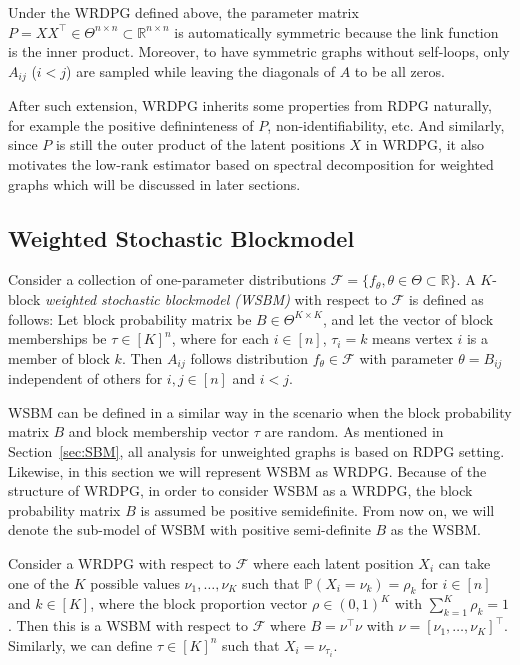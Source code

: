 Under the WRDPG defined above, the parameter matrix $P = X X^{\top} \in \Theta^{n \times n} \subset \mathbb{R}^{n \times n}$ is automatically symmetric because the link function is the inner product. Moreover, to have symmetric graphs without self-loops, only $A_{ij}$ ($i < j$) are sampled while leaving the diagonals of $A$ to be all zeros.

After such extension, WRDPG inherits some properties from RDPG naturally, for example the positive defininteness of $P$, non-identifiability, etc. And similarly, since $P$ is still the outer product of the latent positions $X$ in WRDPG, it also motivates the low-rank estimator based on spectral decomposition for weighted graphs which will be discussed in later sections.




\subsection{Weighted Stochastic Blockmodel}
\label{sec:WSBM}

\begin{definition} 
\label{def:SBM}
Consider a collection of one-parameter distributions $\mathcal{F} = \{ f_{\theta}, \theta \in \Theta \subset \mathbb{R} \}$. A $K$-block {\em{weighted stochastic blockmodel (WSBM)}} with respect to $\mathcal{F}$ is defined as follows: Let block probability matrix be $B \in \Theta^{K \times K}$, and let the vector of block memberships be $\tau \in [K]^n$, where for each $i \in [n]$, $\tau_i = k$ means vertex $i$ is a member of block $k$. Then $A_{ij}$ follows distribution $f_{\theta} \in \mathcal{F}$ with parameter $\theta = B_{ij}$ independent of others for $i, j \in [n]$ and $i < j$.
\end{definition}

WSBM can be defined in a similar way in the scenario when the block probability matrix $B$ and block membership vector $\tau$ are random. As mentioned in Section~\ref{sec:SBM}, all analysis for unweighted graphs is based on RDPG setting. Likewise, in this section we will represent WSBM as WRDPG. Because of the structure of WRDPG, in order to consider WSBM as a WRDPG, the block probability matrix $B$ is assumed be positive semidefinite. From now on, we will denote the sub-model of WSBM with positive semi-definite $B$ as the WSBM.

\begin{definition} 
\label{def:SBM_RDPG}
Consider a WRDPG with respect to $\mathcal{F}$ where each latent position $X_i$ can take one of the $K$ possible values $\nu_1, \dots, \nu_K$ such that $\mathbb{P}(X_i = \nu_k) = \rho_k$ for $i \in [n]$ and $k \in [K]$, where the block proportion vector $\rho \in (0,1)^K$ with $\sum_{k=1}^K \rho_k = 1$. Then this is a WSBM with respect to $\mathcal{F}$ where $B = \nu^{\top} \nu$ with $\nu = [\nu_1, \dots, \nu_K]^{\top}$. Similarly, we can define $\tau \in [K]^n$ such that $X_i = \nu_{\tau_i}$. 
\end{definition}


